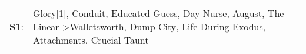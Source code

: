 \begin{supertabular}{p{0.03\textwidth}p{0.92\textwidth}}
 \textbf{S1}:  &  Glory[1]\textsuperscript{}, \enspace Conduit\textsuperscript{}, \enspace Educated Guess\textsuperscript{}, \enspace Day Nurse\textsuperscript{}, \enspace August\textsuperscript{}, \enspace The Linear\textsuperscript{} \textgreater \enspace Walletsworth\textsuperscript{}, \enspace Dump City\textsuperscript{}, \enspace Life During Exodus\textsuperscript{}, \enspace Attachments\textsuperscript{}, \enspace Crucial Taunt\textsuperscript{}  \enspace  \\
\end{supertabular}
